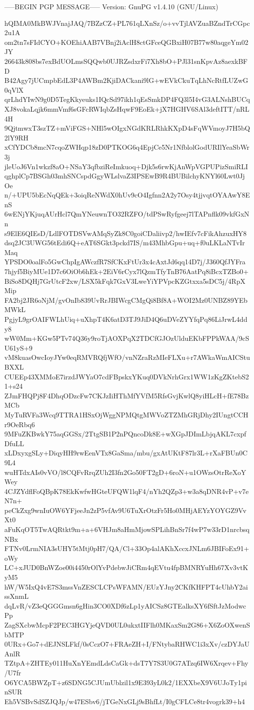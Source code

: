-----BEGIN PGP MESSAGE-----
Version: GnuPG v1.4.10 (GNU/Linux)

hQIMA0MkBWJVnajJAQ/7BZzCZ+PL761qLXnSz/o+vvTjlAVZuaBZndTrCGpc2u1A
om2tn7sFIdCYO+KOEhiAAB7VBnj2iAclH8ctGFceQGBxiH07B77w80aqgeYm02JY
26643k808bs7exBdUOLmsSQQwb0UJRZsdxrFi7Xh8bO+PJl31snKpvAz8aexkBFD
B42Agy7jUCmpbEdL3P4AWBm2KjiDACkani9lG+wEVkCkuTqLhNcRtfLUZwG0qVlX
qrLhdYIwN9g0D5TegKkyeuks1IQcSd97ikh1qEsSmkDP4FQ3l5I4vG3ALNshBUCq
XJ8vokaLqjk6mmVmf6sGFcRWIqbZsHqwF9EoEk+jX7HGHV6SAl3deftITT/nRL4H
9QjtmwxT3szTZ+mViFGS+NHl5wOIgxNGdKRLRhkKXpD4sFqWVmoyJ7H5bQ2lY9RH
xCfYDCb8mcN7cqoZWHqp18zD0PTKOG6q4EpjCe5Nr1NfblolGodURIlYeaSbWr3j
jleUoJ6Vn1wkzf8aO+NSaY3qfbziReImkuoq+Djk5s6rwKjAnWpVGPUPizSmiRLI
qghplCp7BSGh03mhSNCspdGgyWLslvaZ3IPSEwB9R4BUBilchyKNYl60Lwt0JjOe
n/+UPU5bEcNqQEk+3oiqReNWdX0hUv9cO4Igfnn2A2y7Osy4tjjvqtOYAAwY8EnS
6wENjYKjuqAUrHcl7QmYNeuwnTO32RZFO/tdPSwRyfgeej7lTAPnflk09vkfGxNn
s9ElE6QIEsD/LdlFOTDSVwAMqSyZk8C0goiCDaliivp2/hwIEfv7cFikAhzuxHY8
dsq2JC3UWG56tEdi6Q+eAT6SGkt3pckd7IS/m43MhbGpu+uq+f0uLKLaNTvIrMaq
YPSDO0oalFo5GwChpIgAWczfR7SfCKxFtUr3x4cAxtJd6qq14D7j/J360QfJYFra
7hjyf5BiyMUe1D7c6OiOb6hEk+2EiV6rCyx7lQzmTfyTnB76AatPq8iBcxTZBo0+
BiSo8DQHj7GrUtcF2xw/LSX5kFqk7GxV3LweYiYPVpcKZGtxxa5sDC5j/4RpXMip
FA2bj2JR6oNjM/gvOnIb839UvRrJBIWcgCMgQi8Bf8A+WOI2Mz0UNBZ89YEbMWkL
PgjyL9grOAIFWLhUiq+uXhpT4K6atD3TJ9JiD4Q6uDVeZYYfqPq86LiJrwL4ddy8
wW0Mm+KGw5PTv74Q36y9roTjAOXPqX2TDCfGJOzUlduEKbFPPkWAA/9cSU61yS+9
vM8kuasOwcIoyJYw0eqRMVRQfjWfO/vnNZraRzMIeFLXu+r7AWkaWmAICStuBXXL
CUEEp43XMMoE7irzdJWYaO7cdFBpskxYKuq0DVkNrhGrx1WW1zKgZKtebS21+s24
ZJmFHQPj8F4DhqODzcFw7CKJzIiHThMfYVfM5RfsGvjKwlQ8yiHLcH+fE78BzMCb
MyTuRVFa3Wcq9TTRA1HSxOjWggNPMQtgMWVoZTZMhGRjDhy2IUngtCCHr9OeRbq6
9MFuZKBwkY75aqGGSx/2TtgSB1P2nPQncoDk8E+wXGpJDImLbjqAKL7cxpfDfuLL
xLDxyxgSLy+DiqyHH9rwEenVTx8GaSma/mbu/gxAtUKtF87lr3L+rXaFBUn0C9L4
wuHTdxAIs0vVO/l8CQFvRrqZUh2I3fn2Go50FT2gD+6roN+u1OWzsOtrReXoYWey
4CJZYdflFoQBpK78EkKwfwHGteUFQW1lqF4/nYh2QZp3+w3a8qDNR4vP+v7eN7n+
peCkZxg9wnIuOW6YFjeeJn2zP5vfAv9U6TuXrOtzFr5Ho0MHjAEYzYOYGZ9VvXt0
aFuKqOT5TwAQRtkt9m+a+6VHJm8aHmMjowSPLihBnSr7f4wP7w33rD1nrcbsqNBx
FTNv0LrmNIA3sUHY5tMtj0pH7/QA/Cl+33Op4alAKhXccxJNLm6JBIFoEx91+oWy
LC+xJUD0BnWZoe00i4450rOlYvPdebwJiCRm4qEVtu4fpBMNRYuHh67Xv3vtKyM5
hW/W5IxQ4vE7S3mssVnZESCLCPsWFAMN/EUzYJny2CKfKHFPT4cUhbY2aissXnmL
dqLvR/vZ3eQGGGmsn6gHin3CO0XDf6zLp1yAICSz8GTEalksXY6fSftJzModwcPp
ZagSXcbwMcpF2PEC3HGYjeQVD0UL0ukxtIIFlh0MKaxSm2G86+X6ZoOXwenSbMTP
0URx+Go7+dEJNSLFkf/0sCczO7+FRAeZH+I/FNtybaRHWC1i3xXv/czDYJaUAnlR
TZtpA+ZHTEy011HuXnYEmdLdsCaGk+dsT7Y7S3U0G7ATzq6IW6Xrqev+Fhy/U7fr
O6YCA5BWZpT+z6SDNG5CJUmUblzil1x9E393yL0k2/1EXXbeX9V6UJoTy1pinSUR
Eh5VSBvSdSZJQJp/w47ESbv6/jTGeNxGLj9sBhfLt/I0gCFLCe8tr4vogrk39+h4
